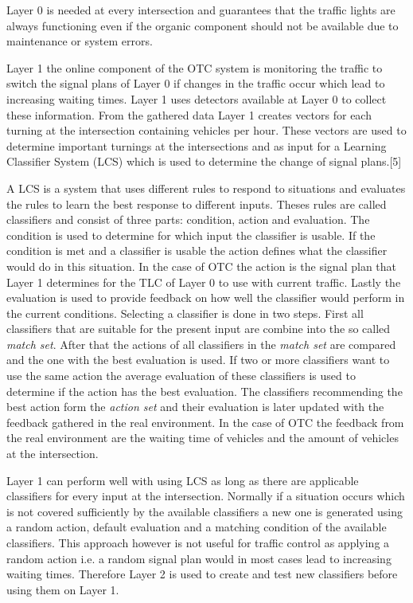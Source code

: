  Layer 0 is needed at every intersection and guarantees that the traffic lights are always functioning even if the organic component should not be available due to maintenance or system errors. \cite{organic1}\cite{organicLCS}
 
Layer 1
the online component of the OTC system is monitoring the traffic to switch the signal plans of Layer 0 if changes in the traffic occur which lead to increasing waiting times. Layer 1 uses detectors available at Layer 0 to collect these information. From the gathered data Layer 1 creates vectors for each turning at the intersection containing vehicles per hour. These vectors are used to determine important turnings at the intersections and as input for a Learning Classifier System (LCS) which is used to determine the change of signal plans.[5]

A LCS is a system that uses different rules to respond to situations and evaluates the rules to learn the best response to different inputs. Theses rules are called classifiers and consist of three parts: condition, action and evaluation. The condition is used to determine for which input the classifier is usable. If the condition is met and a classifier is usable the action defines what the classifier would do in this situation. In the case of OTC the action is the signal plan that Layer 1 determines for the TLC of Layer 0 to use with current traffic. Lastly the evaluation is used to provide feedback on how well the classifier would perform in the current conditions. Selecting a classifier is done in two steps. First all classifiers that are suitable for the present input are combine into the so called \textit{match set}. After that the actions of all classifiers in the \textit{match set} are compared and the one with the best evaluation is used. If two or more classifiers want to use the same action the average evaluation of these classifiers is used to determine if the action has the best evaluation. The classifiers recommending the best action form the \textit{action set} and their evaluation is later updated with the feedback gathered in the real environment. In the case of OTC the feedback from the real environment are the waiting time of vehicles and the amount of vehicles at the intersection.\cite{organic1}\cite{organicLCS}

Layer 1 can perform well with using LCS as long as there are applicable classifiers for every input at the intersection. Normally if a situation occurs which is not covered sufficiently by the available classifiers a new one is generated using a random action, default evaluation and a matching condition of the available classifiers. This approach however is not useful for traffic control as applying a random action i.e. a random signal plan would in most cases lead to increasing waiting times. Therefore Layer 2 is used to create and test new classifiers before using them on Layer 1. \cite{organic1}\cite{organicLCS}

